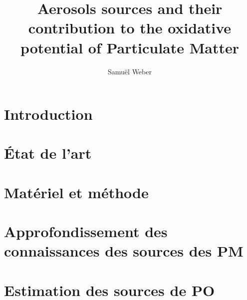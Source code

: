 \documentclass[a4paper,11pt]{book}
\author{Samuël Weber}
\title{Aerosols sources and their contribution to the oxidative potential of Particulate Matter}
\begin{document}
% 
\maketitle

\frontmatter

\clearpage
% 
%

\tableofcontents

\mainmatter

\chapter*{Introduction}%
\label{cha:introduction}

\clearpage

\chapter{État de l'art}
\label{cha:etat_de_lart}
\PartialToc
\clearpage

\clearpage
\printbibliography[segment=\therefsegment,heading=subbibliography]

\chapter{Matériel et méthode}
\label{cha:materiel_et_methode}
\PartialToc
\clearpage

\clearpage
\printbibliography[segment=\therefsegment,heading=subbibliography]

\chapter{Approfondissement des connaissances des sources des PM}%
\label{cha:approfondissement_des_connaissances_des_sources_des_pm}
\PartialToc
\clearpage

\clearpage
\printbibliography[segment=\therefsegment,heading=subbibliography]

\chapter{Estimation des sources de PO}
\label{cha:estimation_des_sources_de_PO}
\PartialToc
\clearpage

\clearpage
\printbibliography[segment=\therefsegment,heading=subbibliography]
\end{document}
